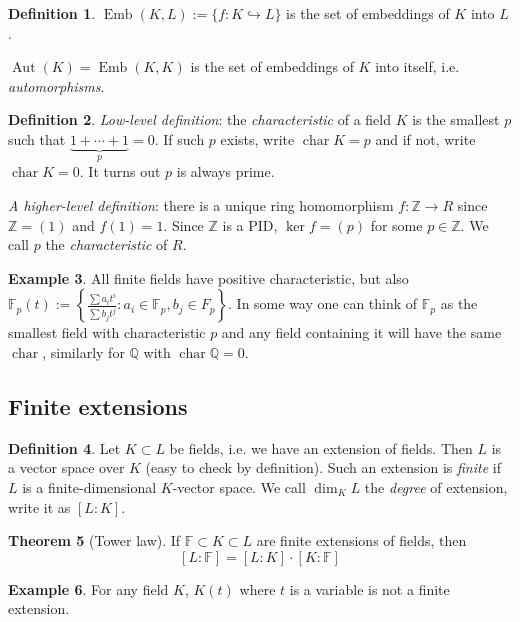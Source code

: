 \documentclass{article}
\newcommand{\F}{\mathbb{F}}
\newcommand{\Z}{\mathbb{Z}}
\newcommand{\Q}{\mathbb{Q}}
\newcommand{\Char}{\operatorname{char}}
\newcommand{\Aut}{\operatorname{Aut}}
\newcommand{\Emb}{\operatorname{Emb}}
\theoremstyle{definition}
\newtheorem{defn}{Definition}[subsection]
\newtheorem{thm}[defn]{Theorem}
\newtheorem{example}[defn]{Example}
\begin{document}
\begin{defn}
$\Emb(K,L):=\{f:K\hookrightarrow L\}$ is the set of embeddings of $K$ into $L$.

$\Aut(K)=\Emb(K,K)$ is the set of embeddings of $K$ into itself, i.e. \textit{automorphisms}.
\end{defn}
\begin{defn}
\textit{Low-level definition}: the \textit{characteristic} of a field $K$ is the smallest $p$ such that $\underbrace{1+\cdots+1}_p=0$. If such $p$ exists, write $\Char K=p$ and if not, write $\Char K=0$. It turns out $p$ is always prime.

\textit{A higher-level definition}: there is a unique ring homomorphism $f:\Z\rightarrow R$ since $\Z=(1)$ and $f(1)=1$. Since $\Z$ is a PID, $\ker f=(p)$ for some $p\in\Z$. We call $p$ the \textit{characteristic} of $R$.
\end{defn}
\begin{example}
All finite fields have positive characteristic, but also $\F_p(t):=\left\{\frac{\sum a_it^i}{\sum b_jt^j}:a_i\in\F_p,b_j\in F_p\right\}$. In some way one can think of $\F_p$ as the smallest field with characteristic $p$ and any field containing it will have the same $\Char$, similarly for $\Q$ with $\Char\Q=0$.
\end{example}

\subsection{Finite extensions}

\begin{defn}
Let $K\subset L$ be fields, i.e. we have an extension of fields. Then $L$ is a vector space over $K$ (easy to check by definition). Such an extension is \textit{finite} if $L$ is a finite-dimensional $K$-vector space. We call $\dim_K L$ the \textit{degree} of extension, write it as $[L:K]$.
\end{defn}

\begin{thm}[Tower law]
If $\F\subset K\subset L$ are finite extensions of fields, then
\[
[L:\F]=[L:K]\cdot [K:\F]
\]
\end{thm}

\begin{example}
For any field $K$, $K(t)$ where $t$ is a variable is not a finite extension.
\end{example}
\end{document}
